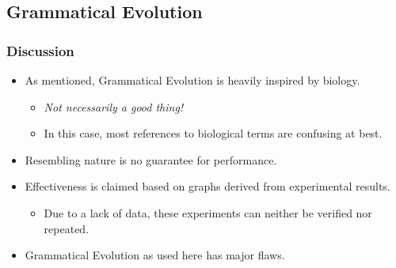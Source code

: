 \documentclass{beamer}
\begin{document}
\subsection{Grammatical Evolution}
\begin{frame}
\frametitle{Discussion}
\begin{itemize}
	\item As mentioned, Grammatical Evolution is heavily inspired by biology.
	\begin{itemize}
		\item \textit{Not necessarily a good thing!}
		\item In this case, most references to biological terms are confusing at best.
	\end{itemize}
	\item Resembling nature is no guarantee for performance.
\end{itemize}

\begin{itemize}
	\item Effectiveness is claimed based on graphs derived from experimental results.
	\begin{itemize}
		\item Due to a lack of data, these experiments can neither be verified nor repeated.
	\end{itemize}
	\item Grammatical Evolution as used here has major flaws.
\end{itemize}
\end{frame}
\end{document}

